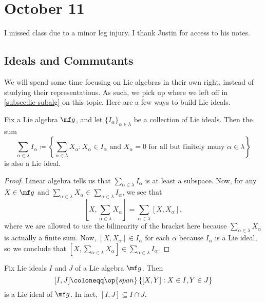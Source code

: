 \documentclass[../notes.tex]{subfiles}
\begin{document}
\section{October 11}
I missed class due to a minor leg injury. I thank Justin for access to his notes.

\subsection{Ideals and Commutants}
We will spend some time focusing on Lie algebras in their own right, instead of studying their representations. As such, we pick up where we left off in \cref{subsec:lie-subalg} on this topic. Here are a few ways to build Lie ideals.
\begin{lemma}
	Fix a Lie algebra $\mf g$, and let $\{I_\alpha\}_{\alpha\in\lambda}$ be a collection of Lie ideals. Then the sum
	\[\sum_{\alpha\in\lambda}I_\alpha\coloneqq\left\{\sum_{\alpha\in\lambda}X_\alpha:X_\alpha\in I_\alpha\text{ and }X_\alpha=0\text{ for all but finitely many }\alpha\in\lambda\right\}\]
	is also a Lie ideal.
\end{lemma}
\begin{proof}
	Linear algebra tells us that $\sum_{\alpha\in\lambda} I_\alpha$ is at least a subspace. Now, for any $X\in\mf g$ and $\sum_{\alpha\in\lambda} X_\alpha\in\sum_{\alpha\in\lambda} I_\alpha$, we see that
	\[\left[X,\sum_{\alpha\in\lambda}X_\alpha\right]=\sum_{\alpha\in\lambda}[X,X_\alpha],\]
	where we are allowed to use the bilinearity of the bracket here because $\sum_{\alpha\in\lambda}X_\alpha$ is actually a finite sum. Now, $[X,X_\alpha]\in I_\alpha$ for each $\alpha$ because $I_\alpha$ is a Lie ideal, so we conclude that $\left[X,\sum_{\alpha\in\lambda}X_\alpha\right]\in\sum_{\alpha\in\lambda}I_\alpha$.
\end{proof}
\begin{lemma} \label{lem:commutator-ideal}
	Fix Lie ideals $I$ and $J$ of a Lie algebra $\mf g$. Then
	\[[I,J]\coloneqq\op{span}\left\{[X,Y]:X\in I,Y\in J\right\}\]
	is a Lie ideal of $\mf g$. In fact, $[I,J]\subseteq I\cap J$.
\end{lemma}
\end{document}
